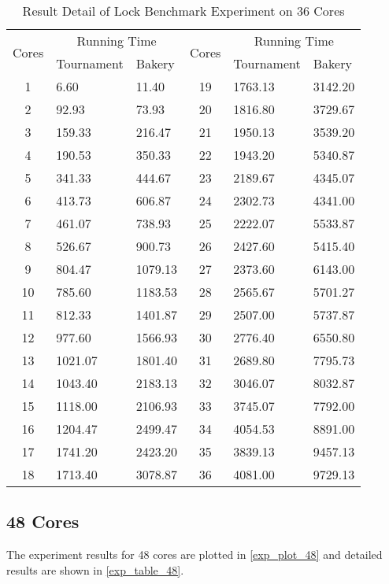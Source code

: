 \documentclass{article}
\begin{document}
\begin{table}[H]
    \caption{Result Detail of Lock Benchmark Experiment on 36 Cores}
    \label{exp_table_36}
    \centering
    \begin{tabular}{c|ll|c|ll}
        \toprule
        \multirow{2}{*}{Cores} & \multicolumn{2}{|c|}{Running Time} &
        \multirow{2}{*}{Cores} & \multicolumn{2}{|c}{Running Time} \\
                               & Tournament & Bakery & & Tournament & Bakery \\\midrule
        1 & 6.60 & 11.40 & 19 & 1763.13 & 3142.20 \\
        2 & 92.93 & 73.93 & 20 & 1816.80 & 3729.67 \\
        3 & 159.33 & 216.47 & 21 & 1950.13 & 3539.20 \\
        4 & 190.53 & 350.33 & 22 & 1943.20 & 5340.87 \\
        5 & 341.33 & 444.67 & 23 & 2189.67 & 4345.07 \\
        6 & 413.73 & 606.87 & 24 & 2302.73 & 4341.00 \\
        7 & 461.07 & 738.93 & 25 & 2222.07 & 5533.87 \\
        8 & 526.67 & 900.73 & 26 & 2427.60 & 5415.40 \\
        9 & 804.47 & 1079.13 & 27 & 2373.60 & 6143.00 \\
        10 & 785.60 & 1183.53 & 28 & 2565.67 & 5701.27 \\
        11 & 812.33 & 1401.87 & 29 & 2507.00 & 5737.87 \\
        12 & 977.60 & 1566.93 & 30 & 2776.40 & 6550.80 \\
        13 & 1021.07 & 1801.40 & 31 & 2689.80 & 7795.73 \\
        14 & 1043.40 & 2183.13 & 32 & 3046.07 & 8032.87 \\
        15 & 1118.00 & 2106.93 & 33 & 3745.07 & 7792.00 \\
        16 & 1204.47 & 2499.47 & 34 & 4054.53 & 8891.00 \\
        17 & 1741.20 & 2423.20 & 35 & 3839.13 & 9457.13 \\
        18 & 1713.40 & 3078.87 & 36 & 4081.00 & 9729.13 \\
        \bottomrule
    \end{tabular}
\end{table}

\subsection*{48 Cores}
The experiment results for 48 cores are plotted in \cref{exp_plot_48} and
detailed results are shown in \cref{exp_table_48}.
\end{document}

